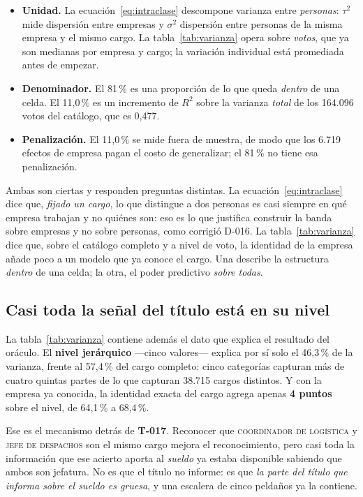 \documentclass[12pt,a4paper,oneside]{report}
\newcommand{\tref}[1]{\textbf{T-#1}}
\begin{document}
\begin{itemize}
  \item \textbf{Unidad.} La ecuación~\eqref{eq:intraclase} descompone varianza entre
  \emph{personas}: $\tau^2$ mide dispersión entre empresas y $\sigma^2$ dispersión entre
  personas de la misma empresa y el mismo cargo. La tabla~\ref{tab:varianza} opera sobre
  \emph{votos}, que ya son medianas por empresa y cargo; la variación individual está
  promediada antes de empezar.

  \item \textbf{Denominador.} El 81\,\% es una proporción de lo que queda \emph{dentro} de
  una celda. El 11,0\,\% es un incremento de $R^2$ sobre la varianza \emph{total} de los
  164.096 votos del catálogo, que es 0,477.

  \item \textbf{Penalización.} El 11,0\,\% se mide fuera de muestra, de modo que los 6.719
  efectos de empresa pagan el costo de generalizar; el 81\,\% no tiene esa penalización.
\end{itemize}

Ambas son ciertas y responden preguntas distintas. La ecuación~\eqref{eq:intraclase} dice
que, \emph{fijado un cargo}, lo que distingue a dos personas es casi siempre en qué
empresa trabajan y no quiénes son: eso es lo que justifica construir la banda sobre
empresas y no sobre personas, como corrigió D-016. La tabla~\ref{tab:varianza} dice que,
sobre el catálogo completo y a nivel de voto, la identidad de la empresa añade poco a un
modelo que ya conoce el cargo. Una describe la estructura \emph{dentro} de una celda; la
otra, el poder predictivo \emph{sobre todas}.

\subsection{Casi toda la señal del título está en su nivel}

La tabla~\ref{tab:varianza} contiene además el dato que explica el resultado del oráculo.
El \textbf{nivel jerárquico} —cinco valores— explica por sí solo el 46,3\,\% de la
varianza, frente al 57,4\,\% del cargo completo: cinco categorías capturan más de cuatro
quintas partes de lo que capturan 38.715 cargos distintos. Y con la empresa ya conocida,
la identidad exacta del cargo agrega apenas \textbf{4 puntos} sobre el nivel, de 64,1\,\%
a 68,4\,\%.

Ese es el mecanismo detrás de \tref{017}. Reconocer que \textsc{coordinador de logística}
y \textsc{jefe de despachos} son el mismo cargo mejora el reconocimiento, pero casi toda
la información que ese acierto aporta al \emph{sueldo} ya estaba disponible sabiendo que
ambos son jefatura. No es que el título no informe: es que \emph{la parte del título que
informa sobre el sueldo es gruesa}, y una escalera de cinco peldaños ya la contiene.
\end{document}
